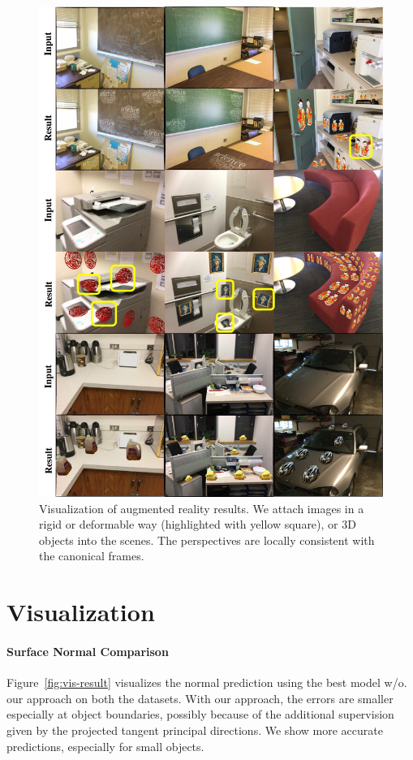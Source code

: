 \begin{figure}
\begin{minipage}{0.49\linewidth}
    \label{fig:vis-result}
\end{minipage}
\begin{minipage}{0.49\linewidth}
    \centering
    \includegraphics[width=\linewidth]{FrameNet/graph/ar-supplemental.pdf}
    \caption{Visualization of augmented reality results. We attach images in a rigid or deformable way (highlighted with yellow square), or 3D objects into the scenes. The perspectives are locally consistent with the canonical frames.}
    \label{fig:ar}
\end{minipage}
\end{figure}


\section{Visualization}
\paragraph{Surface Normal Comparison} Figure~\ref{fig:vis-result} visualizes the normal prediction using the best model w/o. our approach on both the datasets. With our approach, the errors are smaller especially at object boundaries, possibly because of the additional supervision given by the projected tangent principal directions. We show more accurate predictions, especially for small objects.

